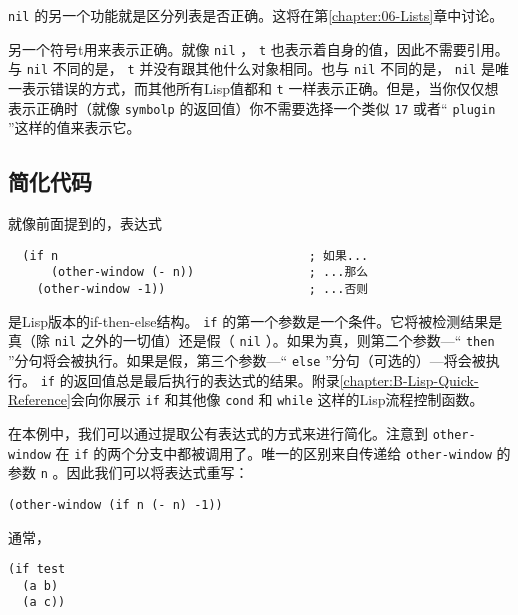 \texttt{nil} 的另一个功能就是区分列表是否正确。这将在第\ref{chapter:06-Lists}章中讨论。

另一个符号t用来表示正确。就像 \texttt{nil} ， \texttt{t} 也表示着自身的值，因此不需要引用。与 \texttt{nil} 不同的是， \texttt{t} 并没有跟其他什么对象相同。也与 \texttt{nil} 不同的是， \texttt{nil} 是唯一表示错误的方式，而其他所有Lisp值都和 \texttt{t} 一样表示正确。但是，当你仅仅想表示正确时（就像 \texttt{symbolp} 的返回值）你不需要选择一个类似 \texttt{17} 或者“ \texttt{plugin} ”这样的值来表示它。

\subsection{简化代码}
\label{section:02-Condensing-the-Code}

就像前面提到的，表达式

\begin{verbatim}
  (if n                                   ; 如果...
      (other-window (- n))                ; ...那么
    (other-window -1))                    ; ...否则
\end{verbatim}

是Lisp版本的if-then-else结构。 \texttt{if} 的第一个参数是一个条件。它将被检测结果是真（除 \texttt{nil} 之外的一切值）还是假（ \texttt{nil} ）。如果为真，则第二个参数---“ \texttt{then} ”分句将会被执行。如果是假，第三个参数---“ \texttt{else} ”分句（可选的）---将会被执行。 \texttt{if} 的返回值总是最后执行的表达式的结果。附录\ref{chapter:B-Lisp-Quick-Reference}会向你展示 \texttt{if} 和其他像 \texttt{cond} 和 \texttt{while} 这样的Lisp流程控制函数。

在本例中，我们可以通过提取公有表达式的方式来进行简化。注意到 \texttt{other-window} 在 \texttt{if} 的两个分支中都被调用了。唯一的区别来自传递给 \texttt{other-window} 的参数 \texttt{n} 。因此我们可以将表达式重写：

\begin{verbatim}
(other-window (if n (- n) -1))
\end{verbatim}

通常，

\begin{verbatim}
(if test
  (a b)
  (a c))
\end{verbatim}


